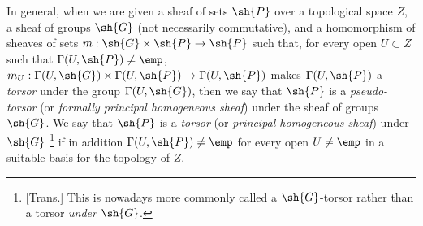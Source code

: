 \begin{env}[16.5.15]
\label{IV.16.5.15}
In general, when we are given a sheaf of sets $\sh{P}$ over a topological space $Z$, a sheaf of groups $\sh{G}$ (not necessarily commutative), and a homomorphism of sheaves of sets $m : \sh{G} \times \sh{P} \to \sh{P}$ such that, for every open $U \subset Z$ such that $\Gamma(U, \sh{P}) \neq \emp$, $m_U : \Gamma(U, \sh{G}) \times \Gamma(U, \sh{P}) \to \Gamma(U, \sh{P})$ makes $\Gamma(U, \sh{P})$ a \emph{torsor} under the group $\Gamma(U,\sh{G})$, then we say that $\sh{P}$ is a \emph{pseudo-torsor} (or \emph{formally principal homogeneous sheaf}) under the sheaf of groups $\sh{G}$.
We say that $\sh{P}$ is a \emph{torsor} (or \emph{principal homogeneous sheaf}) under $\sh{G}$
\footnote{
[Trans.] This is nowadays more commonly called a $\sh{G}$-torsor rather than a torsor \emph{under} $\sh{G}$.
}
if in addition $\Gamma(U, \sh{P}) \neq \emp$ for every open $U \neq \emp$ in a suitable basis for the topology of $Z$.


\end{env}
